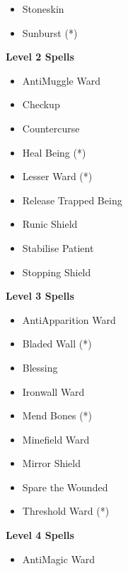 \begin{multicols}{4}
{\begin{itemize}[itemsep=0em]
\item Stoneskin

\item Sunburst (*) 


\end{itemize}
\textbf{Level 2 Spells}
\begin{itemize}[itemsep=0em]
\renewcommand\labelitemi{-}
\item Anti\minus{}Muggle Ward

\item Checkup

\item Countercurse

\item Heal Being (*) 

\item Lesser Ward (*) 

\item Release Trapped Being

\item Runic Shield

\item Stabilise Patient

\item Stopping Shield


\end{itemize}
\textbf{Level 3 Spells}
\begin{itemize}[itemsep=0em]
\renewcommand\labelitemi{-}
\item Anti\minus{}Apparition Ward

\item Bladed Wall (*) 

\item Blessing

\item Ironwall Ward

\item Mend Bones (*) 

\item Minefield Ward

\item Mirror Shield

\item Spare the Wounded

\item Threshold Ward (*) 


\end{itemize}
\textbf{Level 4 Spells}
\begin{itemize}[itemsep=0em]
\renewcommand\labelitemi{-}
\item Anti\minus{}Magic Ward


\end{itemize}}
\end{multicols}
